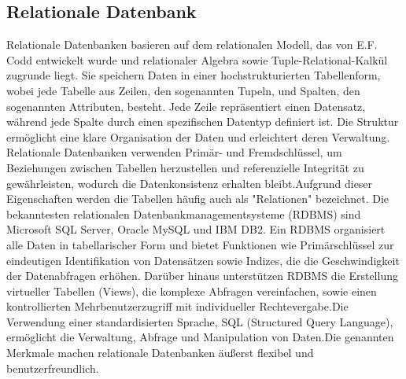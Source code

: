 \subsection{Relationale Datenbank} %
\label{sec:relationaleDatenbanken}
Relationale Datenbanken basieren auf dem relationalen Modell, das von E.F. Codd entwickelt wurde und relationaler Algebra sowie Tuple-Relational-Kalkül zugrunde liegt. Sie speichern Daten in einer hochstrukturierten Tabellenform, wobei jede Tabelle aus Zeilen, den sogenannten Tupeln, und Spalten, den sogenannten Attributen, besteht. Jede Zeile repräsentiert einen Datensatz, während jede Spalte durch einen spezifischen Datentyp definiert ist. Die Struktur ermöglicht eine klare Organisation der Daten und erleichtert deren Verwaltung. Relationale Datenbanken verwenden Primär- und Fremdschlüssel, um Beziehungen zwischen Tabellen herzustellen und referenzielle Integrität zu gewährleisten, wodurch die Datenkonsistenz erhalten bleibt.Aufgrund dieser Eigenschaften werden die Tabellen häufig auch als "Relationen" bezeichnet. Die bekanntesten relationalen Datenbankmanagementsysteme (RDBMS) sind Microsoft SQL Server, Oracle MySQL und IBM DB2. Ein RDBMS organisiert alle Daten in tabellarischer Form und bietet Funktionen wie Primärschlüssel zur eindeutigen Identifikation von Datensätzen sowie Indizes, die die Geschwindigkeit der Datenabfragen erhöhen. Darüber hinaus unterstützen RDBMS die Erstellung virtueller Tabellen (Views), die komplexe Abfragen vereinfachen, sowie einen kontrollierten Mehrbenutzerzugriff mit individueller Rechtevergabe.Die Verwendung einer standardisierten Sprache, SQL (Structured Query Language), ermöglicht die Verwaltung, Abfrage und Manipulation von Daten.Die genannten Merkmale machen relationale Datenbanken äußerst flexibel und benutzerfreundlich.
 \citep{relationalDatabase}  \citep{9677042}
